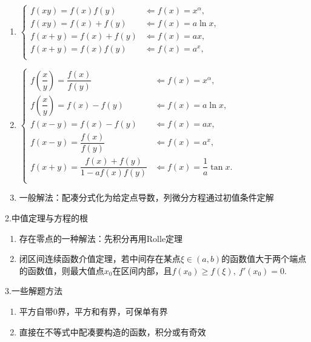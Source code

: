 \documentclass[UTF8]{ctexart}
\numberwithin{equation}{section}
\numberwithin{figure}{section}
\numberwithin{table}{section}
\newcommand\no{\noindent}
\newcommand\gs{\geqslant}
\begin{document}
\begin{spacing}{2}
\begin{enumerate}[itemindent=1.4em, label=(\arabic*)]
\item  $\left\{\begin{array}{ll}
f(xy)=f(x)f(y)&\Longleftarrow f(x)=x^\alpha,\\
f(xy)=f(x)+f(y)&\Longleftarrow f(x)=a\ln x,\\
f(x+y)=f(x)+f(y)&\Longleftarrow f(x)=ax,\\
f(x+y)=f(x)f(y)&\Longleftarrow f(x)=a^x,\\
\end{array}\right.$

\item  $\left\{\begin{array}{ll}
f\left(\dfrac{x}{y}\right)=\dfrac{f(x)}{f(y)}&\Longleftarrow f(x)=x^\alpha,\\
f\left(\dfrac{x}{y}\right)=f(x)-f(y)&\Longleftarrow f(x)=a\ln x,\\
f(x-y)=f(x)-f(y)&\Longleftarrow f(x)=ax,\\
f(x-y)=\dfrac{f(x)}{f(y)}&\Longleftarrow f(x)=a^x,\\
f(x+y)=\dfrac{f(x)+f(y)}{1-af(x)f(y)}&\Longleftarrow f(x)=\dfrac{1}{a}\tan x.\\
\end{array}\right.$

\vspace{0.2cm}

\item 一般解法：配凑分式化为给定点导数，列微分方程通过初值条件定解

\end{enumerate}

\no2.中值定理与方程的根

\begin{enumerate}[itemindent=1.4em, label=(\arabic*)]

\item 存在零点的一种解法：先积分再用Rolle定理

\item 闭区间连续函数介值定理，若中间存在某点$\xi\in(a,b)$的函数值大于两个端点的函数值，则最大值点$x_0$在区间内部，且$f(x_0)\gs f(\xi),\ f'(x_0)=0.$

\end{enumerate}

\no3.一些解题方法

\begin{enumerate}[itemindent=1.4em, label=(\arabic*)]

\item 平方自带0界，平方和有界，可保单有界

\item 直接在不等式中配凑要构造的函数，积分或有奇效


\end{enumerate}
\end{spacing}
\end{document}
